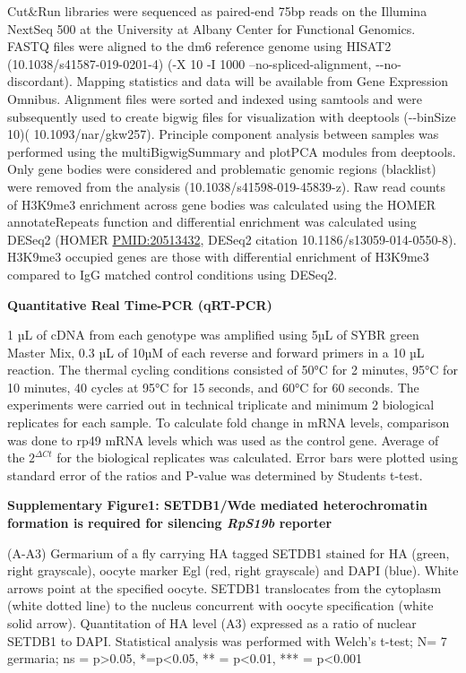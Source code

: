 \documentclass[12pt,oneside]{reedthesis}
\begin{document}
Cut\&Run libraries were sequenced as paired-end 75bp reads on the
Illumina NextSeq 500 at the University at Albany Center for Functional
Genomics. FASTQ files were aligned to the dm6 reference genome using
HISAT2 (10.1038/s41587-019-0201-4) (-X 10 -I 1000
--no-spliced-alignment, -\/-no-discordant). Mapping statistics and data
will be available from Gene Expression Omnibus. Alignment files were
sorted and indexed using samtools and were subsequently used to create
bigwig files for visualization with deeptools (-\/-binSize 10)(
10.1093/nar/gkw257). Principle component analysis between samples was
performed using the multiBigwigSummary and plotPCA modules from
deeptools. Only gene bodies were considered and problematic genomic
regions (blacklist) were removed from the analysis
(10.1038/s41598-019-45839-z). Raw read counts of H3K9me3 enrichment
across gene bodies was calculated using the HOMER annotateRepeats
function and differential enrichment was calculated using DESeq2 (HOMER
\url{PMID:20513432}, DESeq2 citation 10.1186/s13059-014-0550-8). H3K9me3
occupied genes are those with differential enrichment of H3K9me3
compared to IgG matched control conditions using DESeq2.

\textbf{Quantitative Real Time-PCR (qRT-PCR)}

1 µL of cDNA from each genotype was amplified using 5µL of SYBR green
Master Mix, 0.3 µL of 10µM of each reverse and forward primers in a 10
µL reaction. The thermal cycling conditions consisted of 50°C for 2
minutes, 95°C for 10 minutes, 40 cycles at 95°C for 15 seconds, and 60°C
for 60 seconds. The experiments were carried out in technical triplicate
and minimum 2 biological replicates for each sample. To calculate fold
change in mRNA levels, comparison was done to rp49 mRNA levels which was
used as the control gene. Average of the \(2^{\Delta Ct}\) for the biological
replicates was calculated. Error bars were plotted using standard error
of the ratios and P-value was determined by Students t-test.

\textbf{Supplementary Figure1: SETDB1/Wde mediated heterochromatin formation
is required for silencing \emph{RpS19b} reporter}

(A-A3) Germarium of a fly carrying HA tagged SETDB1 stained for HA
(green, right grayscale), oocyte marker Egl (red, right grayscale) and
DAPI (blue). White arrows point at the specified oocyte. SETDB1
translocates from the cytoplasm (white dotted line) to the nucleus
concurrent with oocyte specification (white solid arrow). Quantitation
of HA level (A3) expressed as a ratio of nuclear SETDB1 to DAPI.
Statistical analysis was performed with Welch's t-test; N= 7 germaria;
ns = p\textgreater0.05, *=p\textless0.05, ** = p\textless0.01, *** = p\textless0.001
\end{document}
